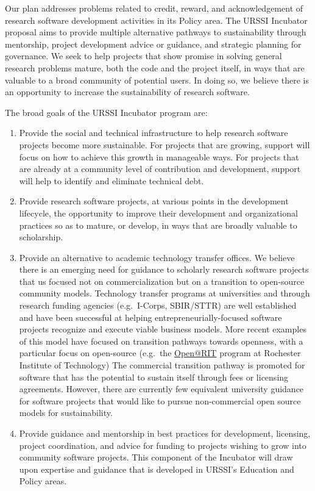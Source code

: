 \documentclass[
]{book}
\begin{document}
Our plan addresses problems related to credit, reward, and acknowledgement of research software development activities in its Policy area.
The URSSI Incubator proposal aims to provide multiple alternative pathways to sustainability through mentorship, project development advice or guidance, and strategic planning for governance.
We seek to help projects that show promise in solving general research problems mature, both the code and the project itself, in ways that are valuable to a broad community of potential users.
In doing so, we believe there is an opportunity to increase the sustainability of research software.

The broad goals of the URSSI Incubator program are:

\begin{enumerate}
\def\labelenumi{\arabic{enumi}.}
\item
  Provide the social and technical infrastructure to help research software projects become more sustainable.
  For projects that are growing, support will focus on how to achieve this growth in manageable ways.
  For projects that are already at a community level of contribution and development, support will help to identify and eliminate technical debt.
\item
  Provide research software projects, at various points in the development lifecycle, the opportunity to improve their development and organizational practices so as to mature, or develop, in ways that are broadly valuable to scholarship.
\item
  Provide an alternative to academic technology transfer offices. We believe there is an emerging need for guidance to scholarly research software projects that us focused not on commercialization but on a transition to open-source community models.
  Technology transfer programs at universities and through research funding agencies (e.g.~I-Corps, SBIR/STTR) are well established and have been successful at helping entrepreneurially-focused software projects recognize and execute viable business models. More recent examples of this model have focused on transition pathways towards openness, with a particular focus on open-source (e.g.~the \href{https://www.rit.edu/research/open}{Open@RIT} program at Rochester Institute of Technology)
  The commercial transition pathway is promoted for software that has the potential to sustain itself through fees or licensing agreements.
  However, there are currently few equivalent university guidance for software projects that would like to pursue non-commercial open source models for sustainability.
\item
  Provide guidance and mentorship in best practices for development, licensing, project coordination, and advice for funding to projects wishing to grow into community software projects.
  This component of the Incubator will draw upon expertise and guidance that is developed in URSSI's Education and Policy areas.
\end{enumerate}
\end{document}
